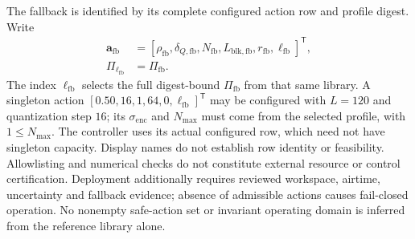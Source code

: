 The fallback is identified by its complete configured action row and profile
digest. Write
\begin{equation}
 \begin{aligned}
 \boldsymbol{a}_{\mathrm{fb}}
 &=[\rho_{\mathrm{fb}},\delta_{Q,\mathrm{fb}},N_{\mathrm{fb}},
          L_{\mathrm{blk},\mathrm{fb}},r_{\mathrm{fb}},\ell_{\mathrm{fb}}]^{\mathsf T},\\
 \Pi_{\ell_{\mathrm{fb}}}&=\Pi_{\mathrm{fb}}.
 \end{aligned}
 \label{eq:daahe_protocol_fallback}
\end{equation}
The index $\ell_{\mathrm{fb}}$ selects the full digest-bound
$\Pi_{\mathrm{fb}}$ from that same library. A singleton action
$[0.50,16,1,64,0,\ell_{\mathrm{fb}}]^{\mathsf T}$ may be configured with
$L=120$ and quantization step $16$; its $\sigma_{\mathrm{enc}}$ and
$N_{\max}$ must come from the selected profile, with $1\leq N_{\max}$.
The controller uses its actual configured row, which need not have singleton
capacity. Display names do not establish row identity or feasibility.
Allowlisting and numerical checks do not constitute external
resource or control certification. Deployment additionally requires reviewed
workspace, airtime, uncertainty and fallback evidence; absence of admissible
actions causes fail-closed operation. No nonempty safe-action set or invariant
operating domain is inferred from the reference library alone.

